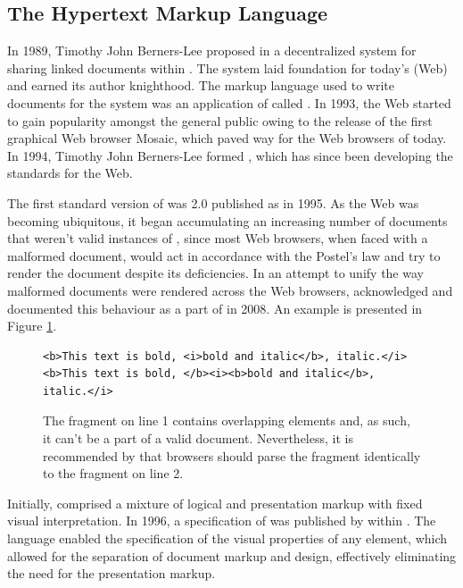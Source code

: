 \documentclass{book}
\begin{document}
\subsection{The Hypertext Markup Language}
In 1989, Timothy John Berners-Lee proposed in \cite{bernerslee89} a
decentralized system for sharing linked documents within . The
system laid foundation for today's  (Web) and earned
its author knighthood. The markup language used to write documents for the
system was an application of  called . In 1993, the
Web started to gain popularity amongst the general public owing to the release
of the first graphical Web browser Mosaic, which paved way for the Web browsers
of today. In 1994, Timothy John Berners-Lee formed , which has
since been developing the standards for the Web.

The first standard version of  was  2.0 published as
\cite{rfc1866} in 1995. As the Web was becoming ubiquitous, it began
accumulating an increasing number of documents that weren't valid instances of
, since most Web browsers, when faced with a malformed document,
would act in accordance with the Postel's law and try to render the document
despite its deficiencies. In an attempt to unify the way malformed
 documents were rendered across the Web browsers, 
acknowledged and documented this behaviour as a part of \cite[Section~8.2,
Parsing HTML documents]{hickson14} in 2008. An example is presented in Figure
\ref{fig:overlapping-elements}.

\begin{figure}[b]
  \begin{verbatim}
<b>This text is bold, <i>bold and italic</b>, italic.</i>
<b>This text is bold, </b><i><b>bold and italic</b>, italic.</i>
  \end{verbatim}
  \caption{The fragment on line 1 contains overlapping elements and, as such, it
    can't be a part of a valid  document. Nevertheless, it is
    recommended by  that browsers should parse the fragment
    identically to the fragment on line 2.}
  \label{fig:overlapping-elements}
\end{figure}

Initially,  comprised a mixture of logical and presentation markup
with fixed visual interpretation. In 1996, a specification of  was
published by  within \cite{lie96}. The language enabled the
specification of the visual properties of any element, which allowed for the
separation of document markup and design, effectively eliminating the need for
the presentation markup.
\end{document}
